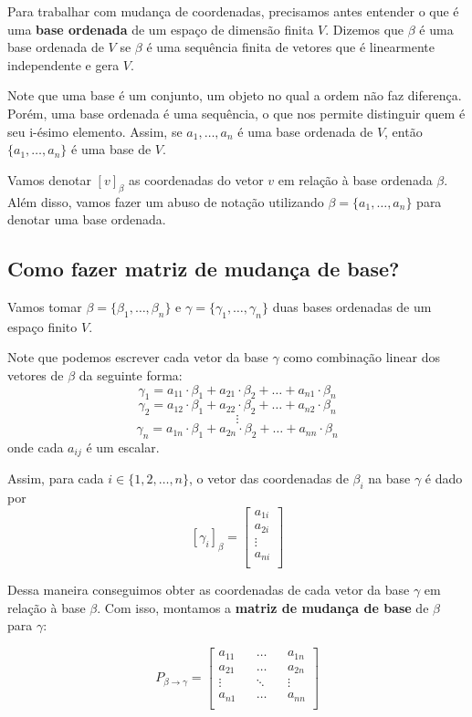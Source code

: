\documentclass[12pt,a4paper]{article}
\begin{document}
Para trabalhar com mudança de coordenadas, precisamos antes entender o que é uma \textbf{base ordenada} de um espaço de dimensão finita $V$. Dizemos que $\beta$ é uma base ordenada de $V$ se $\beta$ é uma sequência finita de vetores que é linearmente independente e gera $V$.

Note que uma base é um conjunto, um objeto no qual a ordem não faz diferença. Porém, uma base ordenada é uma sequência, o que nos permite distinguir quem é seu i-ésimo elemento. Assim, se $a_1, \ldots, a_n$ é uma base ordenada de $V$, então $\{ a_1, \ldots, a_n \}$ é uma base de $V$.

Vamos denotar $[ v ]_\beta$ as coordenadas do vetor $v$ em relação à base ordenada $\beta$. Além disso, vamos fazer um abuso de notação utilizando $\beta = \{ a_1, \ldots, a_n \}$ para denotar uma base ordenada.

\subsection{Como fazer matriz de mudança de base?}

Vamos tomar $\beta = \{ \beta_1, \ldots, \beta_n \}$ e $\gamma = \{ \gamma_1, \ldots, \gamma_n \}$ duas bases ordenadas de um espaço finito $V$.

Note que podemos escrever cada vetor da base $\gamma$ como combinação linear dos vetores de $\beta$ da seguinte forma:
$$\gamma_1 = a_{11}\cdot \beta_1 + a_{21}\cdot \beta_2 + \ldots + a_{n1}\cdot \beta_n$$
$$\gamma_2 = a_{12}\cdot \beta_1 + a_{22}\cdot \beta_2 + \ldots + a_{n2}\cdot \beta_n$$
$$\vdots$$
$$\gamma_n = a_{1n}\cdot \beta_1 + a_{2n}\cdot \beta_2 + \ldots + a_{nn}\cdot \beta_n$$
onde cada $a_{ij}$ é um escalar.

Assim, para cada $i \in \{1, 2, \ldots, n \}$, o vetor das coordenadas de $\beta_i$ na base $\gamma$ é dado por
$$
[\gamma_i]_\beta =
\begin{bmatrix} 
a_{1i} \\
a_{2i} \\
\vdots \\
a_{ni} \\
\end{bmatrix}
$$

Dessa maneira conseguimos obter as coordenadas de cada vetor da base $\gamma$ em relação à base $\beta$. Com isso, montamos a \textbf{matriz de mudança de base} de $\beta$ para $\gamma$:

$$
P_{\beta \to \gamma} =
\begin{bmatrix} 
a_{11} && \ldots && a_{1n} \\
a_{21} && \ldots && a_{2n} \\
\vdots && \ddots && \vdots \\
a_{n1} && \ldots && a_{nn} \\
\end{bmatrix}
$$
\end{document}
